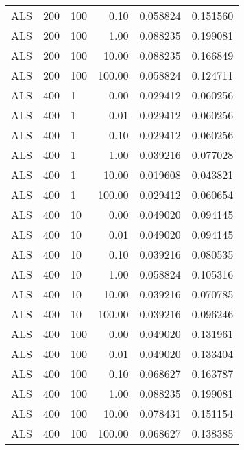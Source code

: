 \begin{tabular}{lllrrr}
  ALS &  200 &    100 &    0.10 &     0.058824 &  0.151560 \\
  ALS &  200 &    100 &    1.00 &     0.088235 &  0.199081 \\
  ALS &  200 &    100 &   10.00 &     0.088235 &  0.166849 \\
  ALS &  200 &    100 &  100.00 &     0.058824 &  0.124711 \\
  ALS &  400 &      1 &    0.00 &     0.029412 &  0.060256 \\
  ALS &  400 &      1 &    0.01 &     0.029412 &  0.060256 \\
  ALS &  400 &      1 &    0.10 &     0.029412 &  0.060256 \\
  ALS &  400 &      1 &    1.00 &     0.039216 &  0.077028 \\
  ALS &  400 &      1 &   10.00 &     0.019608 &  0.043821 \\
  ALS &  400 &      1 &  100.00 &     0.029412 &  0.060654 \\
  ALS &  400 &     10 &    0.00 &     0.049020 &  0.094145 \\
  ALS &  400 &     10 &    0.01 &     0.049020 &  0.094145 \\
  ALS &  400 &     10 &    0.10 &     0.039216 &  0.080535 \\
  ALS &  400 &     10 &    1.00 &     0.058824 &  0.105316 \\
  ALS &  400 &     10 &   10.00 &     0.039216 &  0.070785 \\
  ALS &  400 &     10 &  100.00 &     0.039216 &  0.096246 \\
  ALS &  400 &    100 &    0.00 &     0.049020 &  0.131961 \\
  ALS &  400 &    100 &    0.01 &     0.049020 &  0.133404 \\
  ALS &  400 &    100 &    0.10 &     0.068627 &  0.163787 \\
  ALS &  400 &    100 &    1.00 &     0.088235 &  0.199081 \\
  ALS &  400 &    100 &   10.00 &     0.078431 &  0.151154 \\
  ALS &  400 &    100 &  100.00 &     0.068627 &  0.138385 \\
\bottomrule
\end{tabular}
